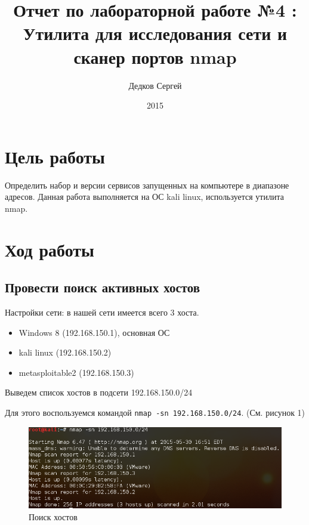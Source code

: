 \documentclass[11pt, a4paper]{article}		%
\author{Дедков Сергей}
\title{Отчет по лабораторной работе №4 :\\ Утилита для исследования сети и сканер портов nmap}
\date{2015}
\begin{document}
\maketitle
\tableofcontents
\newpage



\section{Цель работы}

Определить набор и версии сервисов запущенных на компьютере в диапазоне адресов.
Данная работа выполняется на ОС kali linux, используется утилита nmap.




\section{Ход работы}



\subsection{Провести поиск активных хостов}

Настройки сети: в нашей сети имеется всего 3 хоста.

\begin{itemize}
\item Windows 8 (192.168.150.1), основная ОС
\item kali linux (192.168.150.2)
\item metasploitable2 (192.168.150.3)
\end{itemize}

Выведем список хостов в подсети 192.168.150.0/24

Для этого воспользуемся командой \verb'nmap -sn 192.168.150.0/24'. (См. рисунок 1)

\begin{figure}[h!]
\centering
\includegraphics[scale=0.8]{res/hosts_search}
\caption{Поиск хостов}
\end{figure}
\end{document}

